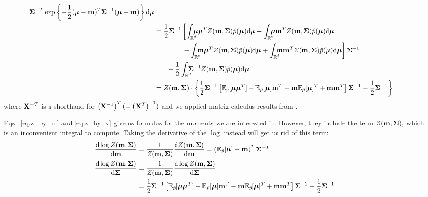 \documentclass[11pt]{article}
\begin{document}
\begin{align}
					\vek{\Sigma}^{-T}
					\exp\left\{-\frac{1}{2}(\boldsymbol{\mu} - \vek{m})^T\vek{\Sigma}^{-1}
										 (\boldsymbol{\mu} - \vek{m})\right\}%
						\byd \boldsymbol{\mu}\\
		&= \frac{1}{2}\vek{\Sigma}^{-1}\left[
					\intrc\boldsymbol{\mu}\boldsymbol{\mu}^TZ(\vek{m}, \vek{\Sigma})\hat{p}(\boldsymbol{\mu})\byd\boldsymbol{\mu}
					- \intrc\boldsymbol{\mu}\vek{m}^T
							Z(\vek{m}, \vek{\Sigma})\hat{p}(\boldsymbol{\mu})\byd\boldsymbol{\mu}
			\right.\notag\\
		&\hphantom{= \frac{1}{2}\sigma^{-1}\left[\right.}\left.%
					- \intrc\vek{m}\boldsymbol{\mu}^T
							Z(\vek{m}, \vek{\Sigma})\hat{p}(\boldsymbol{\mu})\byd\boldsymbol{\mu}
					+ \intrc\vek{m}\vek{m}^T
							Z(\vek{m}, \vek{\Sigma})\hat{p}(\boldsymbol{\mu})\byd\boldsymbol{\mu}
				\right]\vek{\Sigma}^{-1}\notag\\
		&\hphantom{=\frac{1}{2}}%
			- \frac{1}{2}\intrc\vek{\Sigma}^{-1}
					Z(\vek{m}, \vek{\Sigma})\hat{p}(\boldsymbol{\mu})\byd\boldsymbol{\mu}\\
		&=Z(\vek{m}, \vek{\Sigma})\cdot\left\{\frac{1}{2}\vek{\Sigma}^{-1}\left[
				\ee_{\hat{p}}[\boldsymbol{\mu}\boldsymbol{\mu}^T]
				-\ee_{\hat{p}}[\boldsymbol{\mu}]\vek{m}^T
				-\vek{m}\ee_{\hat{p}}[\boldsymbol{\mu}]^T
				+\vek{m}\vek{m}^T      \right]\vek{\Sigma}^{-1}
			-\frac{1}{2}\vek{\Sigma}^{-1}\right\}
		\label{eq:z_by_v}
\end{align}
where $\mathbf{X}^{-T}$ is a shorthand for $\left(\mathbf{X}^{-1}\right)^T 
(=\left(\mathbf{X}^{T}\right)^{-1})$ and we applied matrix calculus results 
from \cite{mcalc}.

Eqs.~\eqref{eq:z_by_m} and \eqref{eq:z_by_v} give us formulas for the 
moments we are interested in.
However, they include the term $Z(\mathbf{m}, \mathbf{\Sigma}),$ which is an 
inconvenient integral to compute. Taking the derivative of the $\log$ 
instead will get us rid of this term:
\begin{align}
	\frac{\byd\log Z(\vek{m}, \vek{\Sigma})}{\byd\vek{m}} %
	&= \frac{1}{Z(\vek{m}, \vek{\Sigma})}\frac{\byd Z(\vek{m}, 
	\vek{\Sigma})}{\byd\vek{m}}
	= \left(\ee_{\hat{p}}[\boldsymbol{\mu}] - \vek{m}\right)^T\vek{\Sigma}^{-1}
	\label{eq:logz_by_m}\\
	\frac{\byd\log Z(\vek{m}, \vek{\Sigma})}{\byd \vek{\Sigma}} %
	&= \frac{1}{Z(\vek{m}, \vek{\Sigma})}\frac{\byd\log Z(\vek{m}, \vek{\Sigma})}{\byd 
	\vek{\Sigma}}\notag\\
	&=\frac{1}{2}\vek{\Sigma}^{-1}\left[
			\ee_{\hat{p}}[\boldsymbol{\mu}\boldsymbol{\mu}^T]
			-\ee_{\hat{p}}[\boldsymbol{\mu}]\vek{m}^T
			-\vek{m}\ee_{\hat{p}}[\boldsymbol{\mu}]^T
			+\vek{m}\vek{m}^T      \right]\vek{\Sigma}^{-1}
		-\frac{1}{2}\vek{\Sigma}^{-1}
	\label{eq:logz_by_v}
\end{align}
\end{document}
